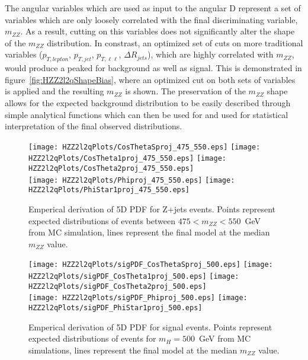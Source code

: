 The angular variables which are used as input to the angular D represent 
a set of variables which are only loosely correlated with the final discriminating 
variable, $m_{ZZ}$.  As a result, cutting on this variables does not significantly
alter the shape of the $m_{ZZ}$ distribution.  In constrast, an optimized set of 
cuts on more traditional variables
($p_{T,lepton}$, $p_{T,jet}$, $p_{T,\ell\ell}$, 
$\Delta R_{jets}$), which are highly correlated with $m_{ZZ}$, 
would produce a peaked for background as well as signal.  This
is demonstrated in figure~\ref{fig:HZZ2l2qShapeBias}, where an
optimized cut on both sets of variables is applied and the 
resulting $m_{ZZ}$ is shown.  The preservation of the $m_{ZZ}$ 
shape allows for the expected background distribution to be
easily described through simple analytical functions which 
can then be used for and used for statistical interpretation
of the final observed distributions.  

\begin{figure}
\begin{center}
\texttt{[image: HZZ2l2qPlots/CosThetaSproj\_475\_550.eps]}  
\texttt{[image: HZZ2l2qPlots/CosTheta1proj\_475\_550.eps]}  
\texttt{[image: HZZ2l2qPlots/CosTheta2proj\_475\_550.eps]}\\
\texttt{[image: HZZ2l2qPlots/Phiproj\_475\_550.eps]}        
\texttt{[image: HZZ2l2qPlots/PhiStar1proj\_475\_550.eps]}   
\caption{ Emperical derivation of 5D PDF for Z+jets events.  Points
represent expected distributions of events between $475<m_{ZZ}<550$~GeV from MC simulation, lines represent the final model at the 
median $m_{ZZ}$ value.}
\label{fig:HZZ2l2qBackgroundPDF}
\end{center}
\end{figure}

\begin{figure}
\begin{center}
\texttt{[image: HZZ2l2qPlots/sigPDF\_CosThetaSproj\_500.eps]}  
\texttt{[image: HZZ2l2qPlots/sigPDF\_CosTheta1proj\_500.eps]}  
\texttt{[image: HZZ2l2qPlots/sigPDF\_CosTheta2proj\_500.eps]}\\
\texttt{[image: HZZ2l2qPlots/sigPDF\_Phiproj\_500.eps]}        
\texttt{[image: HZZ2l2qPlots/sigPDF\_PhiStar1proj\_500.eps]}   
\caption{ Emperical derivation of 5D PDF for signal events.  Points
represent expected distributions of events for $m_H=500$~GeV from MC
simulations, lines represent the final model at the 
median $m_{ZZ}$ value. }
\label{fig:HZZ2l2qSignalPDF}
\end{center}
\end{figure}

